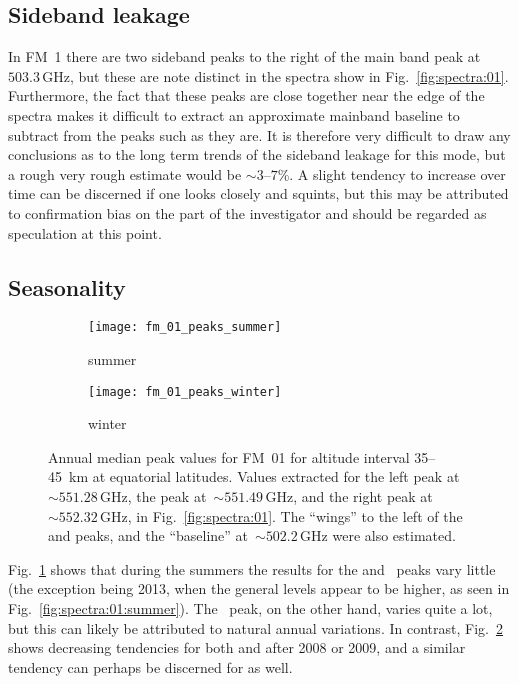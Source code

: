 \subsection{Sideband leakage}
\label{FM01:sbl}
In FM~1 there are two sideband peaks to the right of the main band peak at
$503.3\,\mathrm{GHz}$, but these are note distinct in the spectra show in
Fig.~\ref{fig:spectra:01}.  Furthermore, the fact that these peaks are close
together near the edge of the spectra makes it difficult to extract an
approximate mainband baseline to subtract from the peaks such as they are.  It
is therefore very difficult to draw any conclusions as to the long term trends
of the sideband leakage for this mode, but a rough very rough estimate would be
$\sim3$--$7$\%.  A slight tendency to increase over time can be discerned if
one looks closely and squints, but this may be attributed to confirmation bias
on the part of the investigator and should be regarded as speculation at this
point.


\subsection{Seasonality}
\label{FM01:seasonality}

\begin{figure}[ht]
    \centering
    \begin{subfigure}[b]{0.9545\textwidth}
        \texttt{[image: fm\_01\_peaks\_summer]}
        \caption{summer}\label{fig:peaks:01:summer}
    \end{subfigure}
    \begin{subfigure}[b]{0.9545\textwidth}
        \texttt{[image: fm\_01\_peaks\_winter]}
        \caption{winter}\label{fig:peaks:01:winter}
    \end{subfigure}
    \caption{Annual median peak values for FM~01 for altitude interval
        35--45~km at equatorial latitudes.  Values extracted for the left
         peak at~$\sim551.28\,\mathrm{GHz}$, the  peak
        at~$\sim551.49\,\mathrm{GHz}$, and the right  peak
        at~$\sim552.32\,\mathrm{GHz}$, in Fig.~\ref{fig:spectra:01}.  The
        ``wings'' to the left of the  and  peaks, and the
        ``baseline'' at~$\sim502.2\,\mathrm{GHz}$ were also estimated.
        }\label{fig:peaks:01}
\end{figure}

\noindent
Fig.~\ref{fig:peaks:01:summer} shows that during the summers the results for
the  and ~peaks vary little (the exception being 2013,
when the general levels appear to be higher, as seen in
Fig.~\ref{fig:spectra:01:summer}).  The ~peak, on the other hand,
varies quite a lot, but this can likely be attributed to natural annual
variations.  In contrast, Fig.~\ref{fig:peaks:01:winter} shows decreasing
tendencies for both  and  after 2008 or 2009, and a
similar tendency can perhaps be discerned for  as well.

